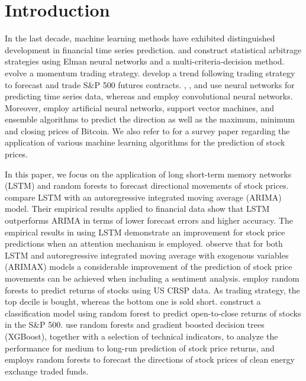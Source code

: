 \documentclass[review]{elsarticle}
\begin{document}
\section{Introduction} 




In the last decade, machine learning methods have exhibited distinguished development in financial time series prediction. 
\cite{huck2009pairs} and \cite{huck2010pairs} construct statistical arbitrage strategies using Elman neural networks and a multi-criteria-decision method.
\cite{takeuchi2013} evolve a momentum trading strategy.
\cite{papaioannou2017s} develop a trend following trading strategy to forecast and trade S\&P 500  futures contracts.
\cite{tran2018}, \cite{sezer2018}, and \cite{singh2020feature} use neural networks for predicting time series data, whereas
\cite{borovykh2018} and \cite{xue2018} employ convolutional neural networks. 
Moreover, \cite{mallqui2019predicting} employ artificial neural networks, support vector machines, and ensemble algorithms to predict the direction as well as the maximum, minimum and closing prices of Bitcoin.
We also refer to \cite{harikrishnan2021machine} for a survey paper regarding the application of various machine learning algorithms for the prediction of stock prices.




In this paper, we focus on the application of long short-term memory networks (LSTM) and random forests to forecast directional movements of stock prices.
\cite{siami2018} compare LSTM with an autoregressive integrated moving average (ARIMA) model.
Their empirical results applied to financial data show that LSTM outperforms ARIMA in terms of lower forecast errors and higher accuracy.
The empirical results in \cite{qiu2020forecasting} using  LSTM demonstrate an improvement for stock price predictions when an attention mechanism is employed.
\cite{sharma2021use} observe that for both LSTM and autoregressive integrated moving average with exogenous variables (ARIMAX) models a considerable improvement of the prediction of stock price movements can be achieved when including a sentiment analysis.
\cite{moritz2014deep} employ random forests to predict returns of stocks using US CRSP data. As trading strategy, the top decile is bought, whereas the bottom one is sold short. 
\cite{lohrmann2019classification} construct a classification model using random forest to predict open-to-close returns of stocks in the S\&P 500.
\cite{basak2019predicting} use random forests and gradient boosted decision trees  (XGBoost), together with a selection of technical indicators, to analyze the performance 
for medium to long-run prediction of stock price returns,
and
\cite{sadorsky2021random} employs random forests to forecast the directions of stock prices of clean energy exchange traded funds.
\end{document}
